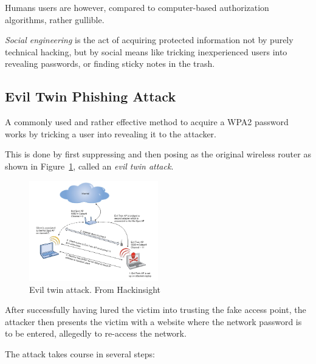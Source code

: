 Humans users are however, compared to computer-based authorization algorithms, rather gullible. 

\emph{Social engineering} is the act of acquiring protected information not by purely technical hacking, but by social means like tricking inexperienced users into revealing passwords, or finding sticky notes in the trash.

\subsection{Evil Twin Phishing Attack}\label{sec:eviltwin}

A commonly used and rather effective method to acquire a WPA2 password works by tricking a user into revealing it to the attacker.

This is done by first suppressing and then posing as the original wireless router as shown in Figure~\ref{fig:eviltwin}, called an \emph{evil twin attack}.

\begin{figure}
\includegraphics[width=0.5\textwidth]{src/img/38_1.jpg}
\caption{Evil twin attack. From Hackinsight~\cite{Hackinsight14}}\label{fig:eviltwin}
\end{figure}

After successfully having lured the victim into trusting the fake access point, the attacker then presents the victim with a website where the network password is to be entered, allegedly to re-access the network.

The attack takes course in several steps:

